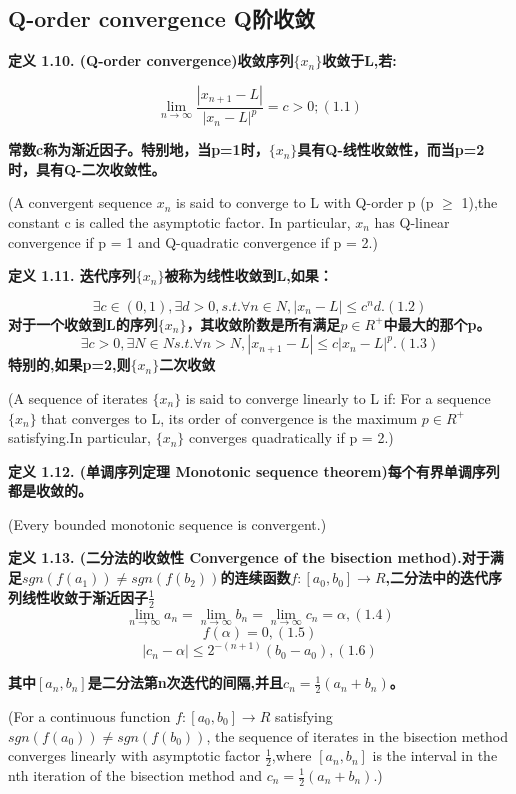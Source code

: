 \documentclass{ctexart}
\begin{document}
\subsection{Q-order convergence Q阶收敛}
\textbf{定义 1.10. (Q-order convergence)收敛序列$\{x_n\}$收敛于L,若:}

\[
\lim_{n \rightarrow \infty} \frac{|x_{n+1} - L|}{|x_n - L|^p} = c > 0; (1.1)
\]

\textbf{常数c称为渐近因子。特别地，当p=1时，$\{x_n\}$具有Q-线性收敛性，而当p=2时，具有Q-二次收敛性。}

(A convergent sequence ${x_n}$ is said to converge to L with Q-order p (p $\ge$ 1),the constant c is called the asymptotic factor. In particular, ${x_n}$ has Q-linear convergence if p = 1 and Q-quadratic convergence if p = 2.)

\textbf{定义 1.11. 迭代序列$\{x_n\}$被称为线性收敛到L,如果：}

\[\exists c \in (0,1),\exists d > 0, s.t. \forall n \in N, |x_n - L| \le c^nd.   (1.2)
\]
\textbf{对于一个收敛到L的序列$\{x_n\}$，其收敛阶数是所有满足$p \in R^+$中最大的那个p。}
\[
\exists c > 0,\exists N \in N s.t. \forall n > N,|x_{n+1}-L| \le c|x_n-L|^p.  (1.3)
\]
\textbf{特别的,如果p=2,则$\{x_n\}$二次收敛}

(A sequence of iterates $\{x_n\}$ is said to converge linearly to L if: For a sequence $\{x_n\}$ that converges to L, its order of convergence is the maximum $p \in R^+$ satisfying.In particular, $\{x_n\}$ converges quadratically if p = 2.)

\textbf{定义 1.12. (单调序列定理 Monotonic sequence theorem)每个有界单调序列都是收敛的。}

(Every bounded monotonic sequence is convergent.)

\textbf{定义 1.13. (二分法的收敛性 Convergence of the bisection method).对于满足$sgn(f(a_1)) \ne sgn(f(b_2))$的连续函数$f:[a_0,b_0]\rightarrow R$,二分法中的迭代序列线性收敛于渐近因子$\frac{1}{2}$}
\[
\lim_{n \rightarrow \infty} a_n = \lim_{n \rightarrow \infty} b_n = \lim_{n \rightarrow \infty} c_n = \alpha, (1.4)
\]
\[
f(\alpha) = 0, (1.5)
\]
\[
|c_n - \alpha| \le 2^{-(n+1)}(b_0 - a_0), (1.6)
\]

\textbf{其中$[a_n,b_n]$是二分法第n次迭代的间隔,并且$c_n = \frac{1}{2}(a_n+b_n)$。}

(For a continuous function $f : [a_0,b_0] \rightarrow R$ satisfying $sgn(f(a_0)) \ne sgn(f(b_0))$, the sequence of iterates in the bisection method converges linearly with asymptotic factor $\frac{1}{2}$,where $[a_n,b_n]$ is the interval in the nth iteration of the bisection method and $c_n = \frac{1}{2}(a_n + b_n )$.)
\end{document}
